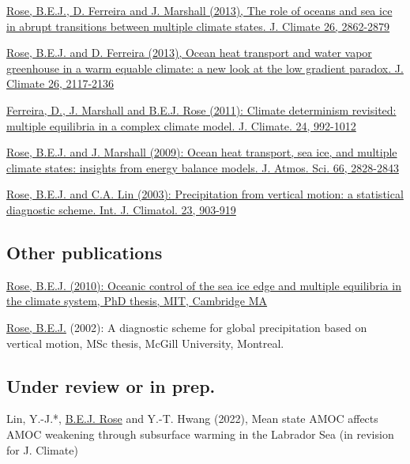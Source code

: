\documentclass[11pt, letterpaper]{article} %
\newcommand{\years}[1]{\marginnote{\scriptsize #1}} %
\newcommand{\publink}{http://www.atmos.albany.edu/facstaff/brose/resources/Publications/}
\begin{document}
\years{2013}  
\href{\publink Rose_etal_transitions_JClim2013.pdf}{\underline{Rose, B.E.J.}, D. Ferreira and J. Marshall (2013), The role of oceans and sea ice in abrupt transitions between multiple climate states. J. Climate 26, 2862-2879}
\vspace{0.2 cm}

\href{\publink Rose_Ferreira_JClim2013.pdf}{\underline{Rose, B.E.J.} and D. Ferreira (2013), Ocean heat transport and water vapor greenhouse in a warm equable climate: a new look at the low gradient paradox. J. Climate 26, 2117-2136}
\vspace{0.2 cm}

\years{2011}  
\href{\publink FMR_JClim2011_MultipleEq.pdf}{Ferreira, D., J. Marshall and \underline{B.E.J. Rose} (2011): Climate determinism revisited: multiple equilibria in a complex climate model. J. Climate. 24, 992-1012}
\vspace{0.2 cm}
  
\years{2009}  
\href{\publink Rose_Marshall_JAS2009.pdf}{\underline{Rose, B.E.J.} and J. Marshall (2009): Ocean heat transport, sea ice, and multiple climate states: insights from energy balance models. J. Atmos. Sci. 66, 2828-2843}
\vspace{0.2 cm}
  
\years{2003}  
\href{\publink Rose_Lin_2003.pdf}{\underline{Rose, B.E.J.} and C.A. Lin (2003): Precipitation from vertical motion: a statistical diagnostic scheme. Int. J. Climatol. 23, 903-919}


\subsection*{Other publications}
\years{2010}  
\href{\publink Rose_PhD_2010.pdf}{\underline{Rose, B.E.J.} (2010): Oceanic control of the sea ice edge and multiple equilibria in the climate system, PhD thesis, MIT, Cambridge MA}
\vspace{0.2 cm}

\years{2002}  
\underline{Rose, B.E.J.} (2002): A diagnostic scheme for global precipitation based on vertical motion, MSc thesis, McGill University, Montreal.


\subsection*{Under review or in prep.}\label{work-in-progress}

Lin, Y.-J.*, \underline{B.E.J. Rose} and Y.-T. Hwang (2022), Mean state AMOC affects AMOC weakening through subsurface warming in the Labrador Sea (in revision for J. Climate)
\vspace{0.2 cm}
\end{document}

